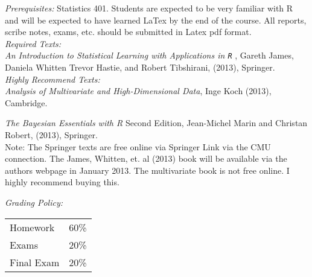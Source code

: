 \documentclass[11pt]{article}
\begin{document}
\emph{Prerequisites:} Statistics 401. Students are expected to be very familiar with R and will be expected to have learned LaTex by the end of the course. All reports, scribe notes, exams, etc. should be submitted in Latex pdf format.  \\



\emph{Required Texts:} \\

\emph{An Introduction to Statistical Learning with Applications in \texttt{R} }, Gareth James, Daniela Whitten Trevor Hastie, and Robert Tibshirani, (2013), Springer.\\



\emph{Highly Recommend Texts:} \\

\emph{Analysis of Multivariate and High-Dimensional Data}, Inge Koch (2013), Cambridge.


\emph{The Bayesian Essentials with R} Second Edition, Jean-Michel Marin and Christan Robert, (2013), Springer.\\

Note: The Springer texts are free online via Springer Link via the CMU connection. The James, Whitten, et. al (2013) book will be available via the authors webpage in January 2013. The multivariate book is not free online. I highly recommend buying this. 


\newpage


\emph{Grading Policy:} 
\begin{table}[htdp]
\begin{tabular}{ll}



Homework &60\%\\
Exams  &20\%\\
Final Exam &20\%\\
\end{tabular}
\label{default}
\end{table}%
\end{document}
